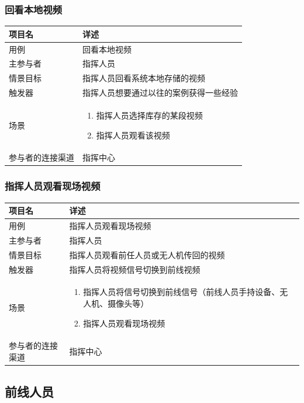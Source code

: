 \documentclass{ctexrep}
\begin{document}
\subsubsection{回看本地视频}
\begin{longtable}{p{2cm} | p{10cm}}
\hline
项目名 & 详述 \\
\hline
\hline
用例 & 回看本地视频\\
\hline
主参与者 & 指挥人员 \\
\hline
情景目标 &  指挥人员回看系统本地存储的视频\\
\hline
触发器 &  指挥人员想要通过以往的案例获得一些经验\\
\hline
场景 & \begin{enumerate}
	\item 指挥人员选择库存的某段视频
	\item 指挥人员观看该视频
\end{enumerate} \\
\hline
参与者的连接渠道 & 指挥中心 \\
\hline
\end{longtable}

\subsubsection{指挥人员观看现场视频}
\begin{longtable}{p{2cm} | p{10cm}}
\hline
项目名 & 详述 \\
\hline
\hline
用例 & 指挥人员观看现场视频\\
\hline
主参与者 & 指挥人员 \\
\hline
情景目标 &  指挥人员观看前任人员或无人机传回的视频\\
\hline
触发器 &  指挥人员将视频信号切换到前线视频\\
\hline
场景 & \begin{enumerate}
	\item 指挥人员将信号切换到前线信号（前线人员手持设备、无人机、摄像头等）
	\item 指挥人员观看现场视频
\end{enumerate} \\
\hline
参与者的连接渠道 & 指挥中心 \\
\hline
\end{longtable}


\subsection{前线人员}
\end{document}
